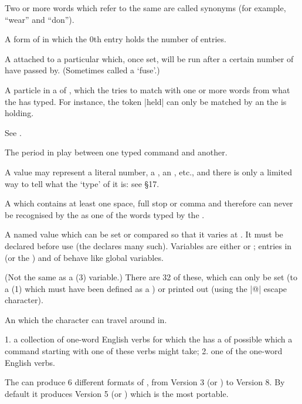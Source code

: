 {{{%
Two or more words which refer to the same  are called synonyms (for
example, ``wear'' and ``don'').

%
A form of  in which the 0th entry holds the number of entries.

%
A  attached to a particular  which, once set, will be
run after a certain number of  have passed by.  (Sometimes called
a `fuse'.)

%
A particle in a  of , which the  tries
to match with one or more words from what the  has typed.  For
instance, the token |held| can only be matched by an  the
 is holding.

%
See .

%
The period in play between one typed command and another.

%
A  value may represent a literal number, a , an
, etc., and there is only a limited way to tell what the
`type' of it is: see \S 17.

%
A  which contains at least one space, full stop or
comma and therefore can never be recognised by the  as one of the
words typed by the .

%
A named value which can be set or compared so that it varies at .
It must be declared before use (the  declares many such).
Variables are either  or ; entries in  (or the
) and  of  behave like global
variables.

%
(Not the same as a  (3) variable.)  There are 32 of these, which
can only be set (to a  (1) which must have been defined as a
) or printed out (using the |@| escape character).

%
An  which the  character can travel around in.

%
1. a collection of  one-word English verbs for which the
 has a  of possible  which a command starting
with one of these verbs might take; 2. one of the one-word English verbs.

%
The  can produce 6 different formats of , from
Version 3 (or ) to Version 8.  By default it produces Version 5
(or ) which is the most portable.

}}}
